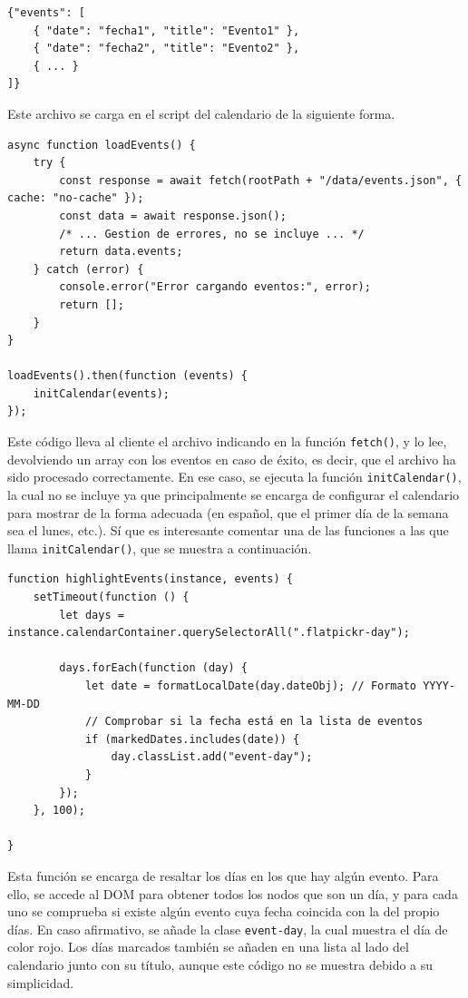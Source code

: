 \documentclass[11pt, a4paper]{book}
\begin{document}
	\begin{lstlisting}
{"events": [
	{ "date": "fecha1", "title": "Evento1" },
	{ "date": "fecha2", "title": "Evento2" },
    { ... }
]}
	\end{lstlisting}

	Este archivo se carga en el script del calendario de la siguiente forma.
	
	\begin{lstlisting}
async function loadEvents() {
	try {
		const response = await fetch(rootPath + "/data/events.json", { cache: "no-cache" });
		const data = await response.json();
		/* ... Gestion de errores, no se incluye ... */
		return data.events;
	} catch (error) {
		console.error("Error cargando eventos:", error);
		return [];
	}
}

loadEvents().then(function (events) {
	initCalendar(events);
});
	\end{lstlisting}
	
	Este código lleva al cliente el archivo indicando en la función \texttt{fetch()}, y lo lee, devolviendo un array con los eventos en caso de éxito, es decir, que el archivo ha sido procesado correctamente. En ese caso, se ejecuta la función \texttt{initCalendar()}, la cual no se incluye ya que principalmente se encarga de configurar el calendario para mostrar de la forma adecuada (en español, que el primer día de la semana sea el lunes, etc.). Sí que es interesante comentar una de las funciones a las que llama \texttt{initCalendar()}, que se muestra a continuación.
	
	\begin{lstlisting}
function highlightEvents(instance, events) {
	setTimeout(function () {
		let days = instance.calendarContainer.querySelectorAll(".flatpickr-day");
		
		days.forEach(function (day) {
			let date = formatLocalDate(day.dateObj); // Formato YYYY-MM-DD
			// Comprobar si la fecha está en la lista de eventos
			if (markedDates.includes(date)) {
				day.classList.add("event-day");
			}
		});
	}, 100);
	
}
	\end{lstlisting}
	
	Esta función se encarga de resaltar los días en los que hay algún evento. Para ello, se accede al DOM para obtener todos los nodos que son un día, y para cada uno se comprueba si existe algún evento cuya fecha coincida con la del propio días. En caso afirmativo, se añade la clase \texttt{event-day}, la cual muestra el día de color rojo. Los días marcados también se añaden en una lista al lado del calendario junto con su título, aunque este código no se muestra debido a su simplicidad.
	
\end{document}
